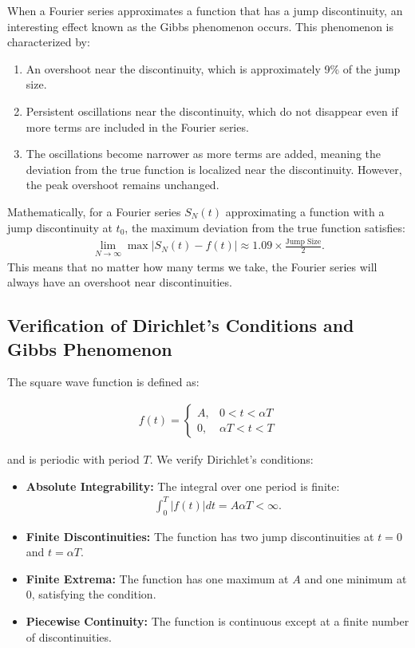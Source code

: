 \documentclass[12pt,a4paper]{report}
\begin{document}
When a Fourier series approximates a function that has a jump discontinuity, an interesting effect known as the Gibbs phenomenon occurs. This phenomenon is characterized by:

\begin{enumerate}
    \item An overshoot near the discontinuity, which is approximately 9\% of the jump size.
    \item Persistent oscillations near the discontinuity, which do not disappear even if more terms are included in the Fourier series.
    \item The oscillations become narrower as more terms are added, meaning the deviation from the true function is localized near the discontinuity. However, the peak overshoot remains unchanged.
\end{enumerate}

Mathematically, for a Fourier series $ S_N(t) $ approximating a function with a jump discontinuity at $ t_0 $, the maximum deviation from the true function satisfies:
\begin{align}
\lim_{N \to \infty} \max |S_N(t) - f(t)| \approx 1.09 \times \frac{\text{Jump Size}}{2}.
\end{align}
This means that no matter how many terms we take, the Fourier series will always have an overshoot near discontinuities.
\subsection{Verification of Dirichlet’s Conditions and Gibbs Phenomenon}

The square wave function is defined as:

\begin{align}
f(t) =
\begin{cases}
A, & 0 < t < \alpha T \\
0, & \alpha T < t < T
\end{cases}
\end{align}

and is periodic with period $ T $. We verify Dirichlet’s conditions:

\begin{itemize}
    \item \textbf{Absolute Integrability:} The integral over one period is finite:
    \begin{align}
    \int_0^T |f(t)| dt = A \alpha T < \infty.
    \end{align}
    \item \textbf{Finite Discontinuities:} The function has two jump discontinuities at $ t = 0 $ and $ t = \alpha T $.
    \item \textbf{Finite Extrema:} The function has one maximum at $ A $ and one minimum at $ 0 $, satisfying the condition.
    \item \textbf{Piecewise Continuity:} The function is continuous except at a finite number of discontinuities.
\end{itemize}
\end{document}
